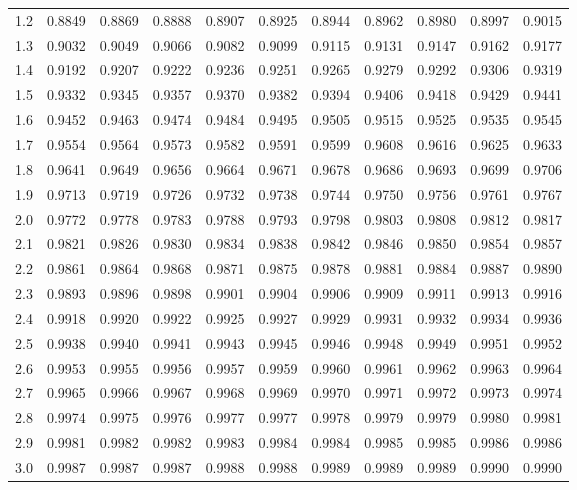 \begin{table}[ht]
\begin{tabular}{|c||cccccccccc|}
		1.2 & 0.8849 & 0.8869 & 0.8888 & 0.8907 & 0.8925 & 0.8944 & 0.8962 & 0.8980 & 0.8997 & 0.9015 \\ 
		1.3 & 0.9032 & 0.9049 & 0.9066 & 0.9082 & 0.9099 & 0.9115 & 0.9131 & 0.9147 & 0.9162 & 0.9177 \\ 
		1.4 & 0.9192 & 0.9207 & 0.9222 & 0.9236 & 0.9251 & 0.9265 & 0.9279 & 0.9292 & 0.9306 & 0.9319 \\ 
		\hline
		1.5 & 0.9332 & 0.9345 & 0.9357 & 0.9370 & 0.9382 & 0.9394 & 0.9406 & 0.9418 & 0.9429 & 0.9441 \\ 
		1.6 & 0.9452 & 0.9463 & 0.9474 & 0.9484 & 0.9495 & 0.9505 & 0.9515 & 0.9525 & 0.9535 & 0.9545 \\ 
		1.7 & 0.9554 & 0.9564 & 0.9573 & 0.9582 & 0.9591 & 0.9599 & 0.9608 & 0.9616 & 0.9625 & 0.9633 \\ 
		1.8 & 0.9641 & 0.9649 & 0.9656 & 0.9664 & 0.9671 & 0.9678 & 0.9686 & 0.9693 & 0.9699 & 0.9706 \\ 
		1.9 & 0.9713 & 0.9719 & 0.9726 & 0.9732 & 0.9738 & 0.9744 & 0.9750 & 0.9756 & 0.9761 & 0.9767 \\ 
		\hline
		2.0 & 0.9772 & 0.9778 & 0.9783 & 0.9788 & 0.9793 & 0.9798 & 0.9803 & 0.9808 & 0.9812 & 0.9817 \\ 
		2.1 & 0.9821 & 0.9826 & 0.9830 & 0.9834 & 0.9838 & 0.9842 & 0.9846 & 0.9850 & 0.9854 & 0.9857 \\ 
		2.2 & 0.9861 & 0.9864 & 0.9868 & 0.9871 & 0.9875 & 0.9878 & 0.9881 & 0.9884 & 0.9887 & 0.9890 \\ 
		2.3 & 0.9893 & 0.9896 & 0.9898 & 0.9901 & 0.9904 & 0.9906 & 0.9909 & 0.9911 & 0.9913 & 0.9916 \\ 
		2.4 & 0.9918 & 0.9920 & 0.9922 & 0.9925 & 0.9927 & 0.9929 & 0.9931 & 0.9932 & 0.9934 & 0.9936 \\ 
		\hline
		2.5 & 0.9938 & 0.9940 & 0.9941 & 0.9943 & 0.9945 & 0.9946 & 0.9948 & 0.9949 & 0.9951 & 0.9952 \\ 
		2.6 & 0.9953 & 0.9955 & 0.9956 & 0.9957 & 0.9959 & 0.9960 & 0.9961 & 0.9962 & 0.9963 & 0.9964 \\ 
		2.7 & 0.9965 & 0.9966 & 0.9967 & 0.9968 & 0.9969 & 0.9970 & 0.9971 & 0.9972 & 0.9973 & 0.9974 \\ 
		2.8 & 0.9974 & 0.9975 & 0.9976 & 0.9977 & 0.9977 & 0.9978 & 0.9979 & 0.9979 & 0.9980 & 0.9981 \\ 
		2.9 & 0.9981 & 0.9982 & 0.9982 & 0.9983 & 0.9984 & 0.9984 & 0.9985 & 0.9985 & 0.9986 & 0.9986 \\ 
		3.0 & 0.9987 & 0.9987 & 0.9987 & 0.9988 & 0.9988 & 0.9989 & 0.9989 & 0.9989 & 0.9990 & 0.9990 \\ 
		 \hline
	\end{tabular}
\end{table}

